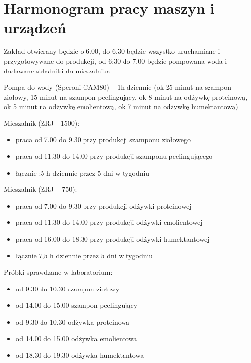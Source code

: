 \section{Harmonogram pracy maszyn i urządzeń}

Zakład otwierany będzie o 6.00, do 6.30 będzie wszystko uruchamiane i przygotowywane do produkcji, od 6:30 do 7.00 będzie pompowana woda i dodawane składniki do mieszalnika.\vspace{\baselineskip}

Pompa do wody (\textsf{Speroni CAM80}) – 1h dziennie (ok 25 minut na szampon ziołowy, 15 minut na szampon peelingujący, ok 8 minut na odżywkę proteinową, ok 5 minut na odżywkę emolientową, ok 7 minut na odżywkę humektantową)\vspace{\baselineskip}

Mieszalnik (\textsf{ZRJ - 1500}):
\begin{itemize}
	\item praca od 7.00 do 9.30 przy produkcji szamponu ziołowego
	\item praca od 11.30 do 14.00 przy produkcji szamponu peelingującego
	\item łącznie :5 h dziennie przez 5 dni w tygodniu
\end{itemize}\vspace{\baselineskip}

Mieszalnik (\textsf{ZRJ – 750}):
\begin{itemize}
	\item praca od 7.00 do 9.30 przy produkcji odżywki proteinowej
	\item praca od 11.30 do 14.00 przy produkcji odżywki emolientowej
	\item praca od 16.00 do 18.30 przy produkcji odżywki humektantowej
	\item łącznie 7,5 h dziennie przez 5 dni w tygodniu
\end{itemize}\vspace{\baselineskip}

Próbki sprawdzane w laboratorium:
\begin{itemize}
\item od 9.30 do 10.30 szampon ziołowy
\item od 14.00 do 15.00 szampon peelingujący
\item od 9.30 do 10.30 odżywka proteinowa
\item od 14.00 do 15.00 odżywka emolientowa
\item od 18.30 do 19.30 odżywka humektantowa
\end{itemize}\vspace{\baselineskip}

